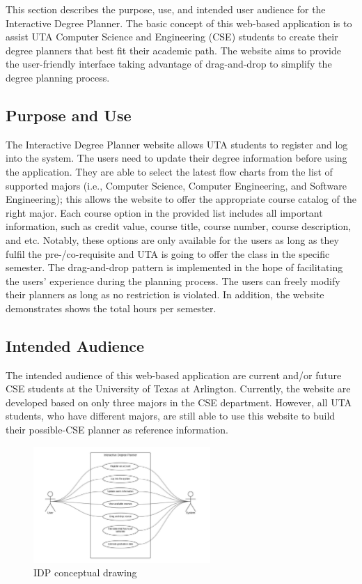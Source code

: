 This section describes the purpose, use, and intended user audience for the Interactive Degree Planner. The basic concept of this web-based application is to assist UTA Computer Science and Engineering (CSE) students to create their degree planners that best fit their academic path. The website aims to provide the user-friendly interface taking advantage of drag-and-drop to simplify the degree planning process.

\subsection{Purpose and Use}
The Interactive Degree Planner website allows UTA students to register and log into the system. The users need to update their degree information before using the application. They are able to select the latest flow charts from the list of supported majors (i.e., Computer Science, Computer Engineering, and Software Engineering); this allows the website to offer the appropriate course catalog of the right major. Each course option in the provided list includes all important information, such as credit value, course title, course number, course description, and etc. Notably, these options are only available for the users as long as they fulfil the pre-/co-requisite and UTA is going to offer the class in the specific semester. The drag-and-drop pattern is implemented in the hope of facilitating the users' experience during the planning process. The users can freely modify their planners as long as no restriction is violated. In addition, the website demonstrates shows the total hours per semester.

\subsection{Intended Audience}
The intended audience of this web-based application are current and/or future CSE students at the University of Texas at Arlington. Currently, the website are developed based on only three majors in the CSE department. However, all UTA students, who have different majors, are still able to use this website to build their possible-CSE planner as reference information.

\begin{figure}[h!]
	\centering
	\includegraphics[width=0.60\textwidth]{images/uml}
	\caption{IDP conceptual drawing}
\end{figure}
